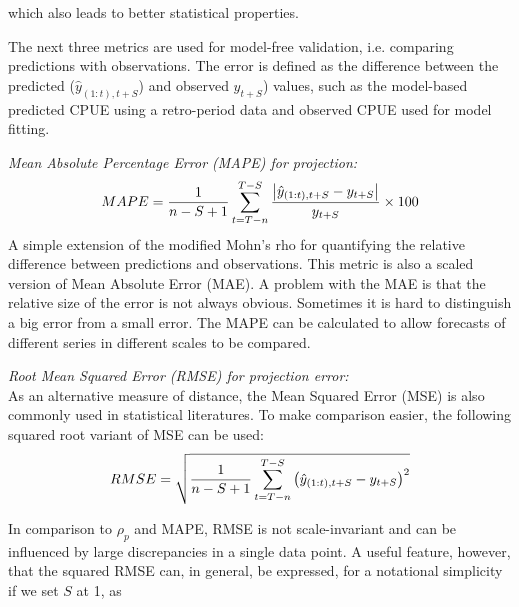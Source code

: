 which also leads to better statistical properties.


\vspace{0.2cm} 
The next three metrics are used for model-free validation, i.e. comparing predictions with observations. The error is defined as the difference between the predicted ($\hat{y}_{(1:t),t+S}$) and observed $y_{t+S}$) values, such as the model-based predicted CPUE using a retro-period data and observed CPUE used for model fitting. 

\vspace{0.2cm} \noindent
{\it Mean Absolute Percentage Error (MAPE) for projection:}
\begin{equation}
\label{eqn:mape}
MAPE = \displaystyle \frac{1}{n-S+1} \sum_{t=T-n}^{T-S}
\frac{\left| \hat{y}_{(1:t),t+S}-y_{t+S} \right|}{y_{t+S}} \times 100 
\end{equation} 
A simple extension of the modified Mohn's rho for quantifying the relative difference between predictions and observations. This metric is also a scaled version of Mean Absolute Error (MAE). A problem with the MAE is that the relative size of the error is not always obvious. Sometimes it is hard to distinguish a big error from a small error. The MAPE can be calculated to allow forecasts of different series in different scales to be compared.

\vspace{0.2cm} \noindent
{\it Root Mean Squared Error (RMSE) for projection error:}\\
As an alternative measure of distance, the Mean Squared Error (MSE) is also commonly used in statistical literatures. To make comparison easier, the following squared root variant of MSE can be used: 
\begin{equation}
\label{eqn:rmse}
RMSE = \displaystyle \sqrt{ \frac{1}{n-S+1} \sum_{t=T-n}^{T-S} 
\left( \hat{y}_{(1:t),t+S}-y_{t+S} \right)^2 }
\end{equation} 

In comparison to $\rho_p$ and MAPE, RMSE is not scale-invariant and can be influenced by large discrepancies in a single data point. A useful feature, however, that the squared RMSE can, in general, be expressed,  for a notational simplicity if we set $S$ at 1, as

